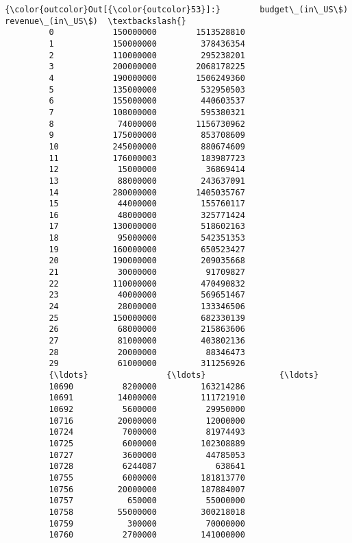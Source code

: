 \documentclass[11pt]{article}
\begin{document}
\begin{Verbatim}[commandchars=\\\{\}]
{\color{outcolor}Out[{\color{outcolor}53}]:}        budget\_(in\_US\$)  revenue\_(in\_US\$)  \textbackslash{}
         0            150000000        1513528810   
         1            150000000         378436354   
         2            110000000         295238201   
         3            200000000        2068178225   
         4            190000000        1506249360   
         5            135000000         532950503   
         6            155000000         440603537   
         7            108000000         595380321   
         8             74000000        1156730962   
         9            175000000         853708609   
         10           245000000         880674609   
         11           176000003         183987723   
         12            15000000          36869414   
         13            88000000         243637091   
         14           280000000        1405035767   
         15            44000000         155760117   
         16            48000000         325771424   
         17           130000000         518602163   
         18            95000000         542351353   
         19           160000000         650523427   
         20           190000000         209035668   
         21            30000000          91709827   
         22           110000000         470490832   
         23            40000000         569651467   
         24            28000000         133346506   
         25           150000000         682330139   
         26            68000000         215863606   
         27            81000000         403802136   
         28            20000000          88346473   
         29            61000000         311256926   
         {\ldots}                {\ldots}               {\ldots}   
         10690          8200000         163214286   
         10691         14000000         111721910   
         10692          5600000          29950000   
         10716         20000000          12000000   
         10724          7000000          81974493   
         10725          6000000         102308889   
         10727          3600000          44785053   
         10728          6244087            638641   
         10755          6000000         181813770   
         10756         20000000         187884007   
         10757           650000          55000000   
         10758         55000000         300218018   
         10759           300000          70000000   
         10760          2700000         141000000   

\end{Verbatim}
\end{document}
